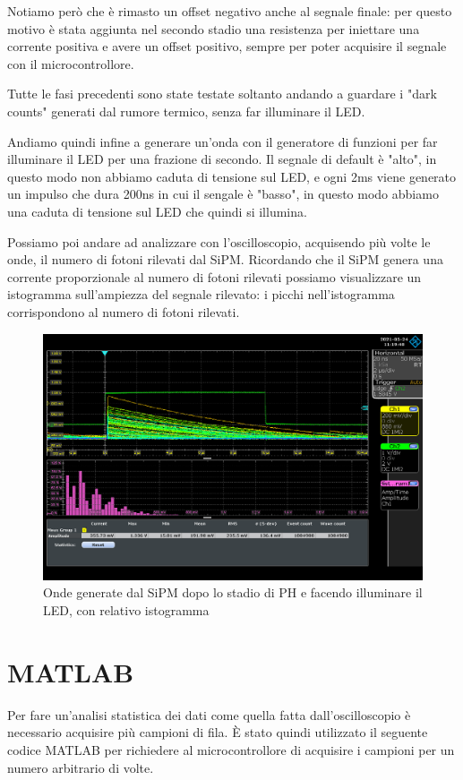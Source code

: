 Notiamo però che è rimasto un offset negativo anche al segnale finale: per questo motivo è stata aggiunta nel secondo stadio una resistenza per iniettare una corrente positiva e avere un offset positivo, sempre per poter acquisire il segnale con il microcontrollore.

Tutte le fasi precedenti sono state testate soltanto andando a guardare i "dark counts" generati dal rumore termico, senza far illuminare il LED.

Andiamo quindi infine a generare un'onda con il generatore di funzioni per far illuminare il LED per una frazione di secondo. Il segnale di default è "alto", in questo modo non abbiamo caduta di tensione sul LED, e ogni 2ms viene generato un impulso che dura 200ns in cui il sengale è "basso", in questo modo abbiamo una caduta di tensione sul LED che quindi si illumina.

Possiamo poi andare ad analizzare con l'oscilloscopio, acquisendo più volte le onde, il numero di fotoni rilevati dal SiPM. Ricordando che il SiPM genera una corrente proporzionale al numero di fotoni rilevati possiamo visualizzare un istogramma sull'ampiezza del segnale rilevato: i picchi nell'istogramma corrispondono al numero di fotoni rilevati.

\begin{figure}[H]
\centering
\includegraphics[width=\textwidth]{assets/exp9/sipm_oscilloscopio_istogramma.png}
\caption{Onde generate dal SiPM dopo lo stadio di PH e facendo illuminare il LED, con relativo istogramma}
\end{figure}

\section*{MATLAB}
Per fare un'analisi statistica dei dati come quella fatta dall'oscilloscopio è necessario acquisire più campioni di fila.
È stato quindi utilizzato il seguente codice MATLAB per richiedere al microcontrollore di acquisire i campioni per un numero arbitrario di volte.


